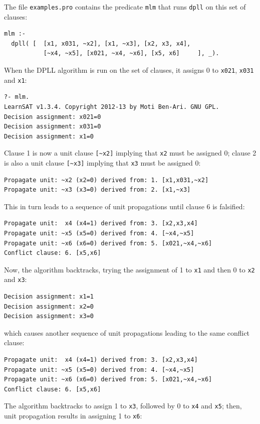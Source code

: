 \documentclass[11pt]{article}
\newcommand*{\p}[1]{\textup{\texttt{#1}}}
\begin{document}
The file \p{examples.pro} contains the predicate \p{mlm} that runs
\p{dpll} on this set of clauses:

\begin{verbatim}
mlm :-
  dpll( [  [x1, x031, ~x2], [x1, ~x3], [x2, x3, x4],
           [~x4, ~x5], [x021, ~x4, ~x6], [x5, x6]     ], _).
\end{verbatim}

When the DPLL algorithm is run on the set of clauses, it assigns
0 to \p{x021}, \p{x031} and \p{x1}:

\begin{verbatim}
?- mlm.
LearnSAT v1.3.4. Copyright 2012-13 by Moti Ben-Ari. GNU GPL.
Decision assignment: x021=0
Decision assignment: x031=0
Decision assignment: x1=0
\end{verbatim}

Clause 1 is now a unit clause \verb+[~x2]+ implying that \p{x2} must be
assigned 0; clause 2 is also a unit clause \verb+[~x3]+ implying that
\p{x3} must be assigned 0:

\begin{verbatim}
Propagate unit: ~x2 (x2=0) derived from: 1. [x1,x031,~x2]
Propagate unit: ~x3 (x3=0) derived from: 2. [x1,~x3]
\end{verbatim}

This in turn leads to a sequence of unit propagations until clause 6
is falsified:

\begin{verbatim}
Propagate unit:  x4 (x4=1) derived from: 3. [x2,x3,x4]
Propagate unit: ~x5 (x5=0) derived from: 4. [~x4,~x5]
Propagate unit: ~x6 (x6=0) derived from: 5. [x021,~x4,~x6]
Conflict clause: 6. [x5,x6]
\end{verbatim}

Now, the algorithm backtracks, trying the assignment of 1 to \p{x1} and
then 0 to \p{x2} and \p{x3}:
\begin{verbatim}
Decision assignment: x1=1
Decision assignment: x2=0
Decision assignment: x3=0
\end{verbatim}
which causes another sequence of unit propagations leading to the same
conflict clause:
\begin{verbatim}
Propagate unit:  x4 (x4=1) derived from: 3. [x2,x3,x4]
Propagate unit: ~x5 (x5=0) derived from: 4. [~x4,~x5]
Propagate unit: ~x6 (x6=0) derived from: 5. [x021,~x4,~x6]
Conflict clause: 6. [x5,x6]
\end{verbatim}

The algorithm backtracks to assign 1 to \p{x3}, followed by 0 to \p{x4}
and \p{x5}; then, unit propagation results in assigning 1 to \p{x6}:
\end{document}

